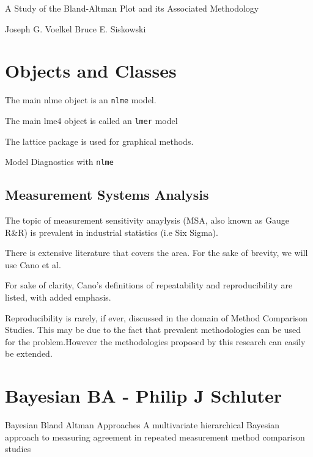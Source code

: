 \documentclass[12pt, a4paper]{report}
\theoremstyle{plain}
\theoremstyle{definition}
\theoremstyle{remark}
\begin{document}
A Study of the Bland-Altman Plot and its Associated Methodology

Joseph G. Voelkel Bruce E. Siskowski 





\section*{Objects and Classes}

The main nlme object is an \texttt{nlme} model.

The main lme4 object is called an \texttt{lmer} model

The lattice package is used for graphical methods.


Model Diagnostics with \texttt{nlme}




\subsection*{Measurement Systems Analysis}The topic of measurement sensitivity anaylysis (MSA, also known as Gauge R\&R) is prevalent in industrial statistics (i.e Six Sigma).

There is extensive literature that covers the area. For the sake of brevity, we will use Cano et al.

For sake of clarity, Cano's definitions of repeatability and reproducibility are listed, with added emphasis.

Reproducibility is rarely, if ever, discussed in the domain of Method Comparison Studies. This may be due to the fact that prevalent methodologies can be used for the problem.However
the methodologies proposed by this research can easily be extended.






\section*{Bayesian BA - Philip J Schluter}
Bayesian Bland Altman Approaches
A multivariate hierarchical Bayesian approach to measuring agreement in repeated
measurement method comparison studies
\end{document}
